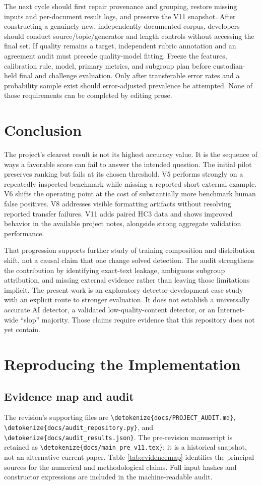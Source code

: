 \documentclass[11pt]{article}
\newcommand{\code}[1]{\expandafter\nolinkurl\expandafter{\detokenize{#1}}}
\begin{document}
The next cycle should first repair provenance and grouping, restore missing
inputs and per-document result logs, and preserve the V11 snapshot. After
constructing a genuinely new, independently documented corpus, developers
should conduct source/topic/generator and length controls without accessing
the final set. If quality remains a target, independent rubric annotation
and an agreement audit must precede quality-model fitting. Freeze the
features, calibration rule, model, primary metrics, and subgroup plan before
custodian-held final and challenge evaluation. Only after transferable error
rates and a probability sample exist should error-adjusted prevalence be
attempted. None of those requirements can be completed by editing prose.

\section{Conclusion}
The project's clearest result is not its highest accuracy value. It is the
sequence of ways a favorable score can fail to answer the intended question.
The initial pilot preserves ranking but fails at its chosen threshold. V5
performs strongly on a repeatedly inspected benchmark while missing a
reported short external example. V6 shifts the operating point at the cost
of substantially more benchmark human false positives. V8 addresses visible
formatting artifacts without resolving reported transfer failures. V11
adds paired HC3 data and shows improved behavior in the available project
notes, alongside strong aggregate validation performance.

That progression supports further study of training composition and
distribution shift, not a causal claim that one change solved detection.
The audit strengthens the contribution by identifying exact-text leakage,
ambiguous subgroup attribution, and missing external evidence rather than
leaving those limitations implicit. The present work is an exploratory
detector-development case study with an explicit route to stronger
evaluation. It does not establish a universally accurate AI detector,
a validated low-quality-content detector, or an Internet-wide ``slop''
majority. Those claims require evidence that this repository does not yet
contain.

\appendix
\section{Reproducing the Implementation}
\subsection{Evidence map and audit}
The revision's supporting files are \code{docs/PROJECT_AUDIT.md},
\code{docs/audit_repository.py}, and \code{docs/audit_results.json}.
The pre-revision manuscript is retained as \code{docs/main_pre_v11.tex};
it is a historical snapshot, not an alternative current paper. Table
\ref{tab:evidencemap} identifies the principal sources for the numerical
and methodological claims. Full input hashes and constructor expressions
are included in the machine-readable audit.
\end{document}
